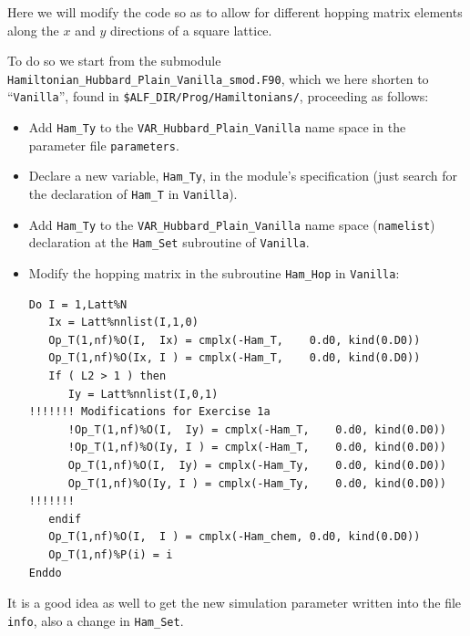\documentclass[10pt,modern]{scrartcl}
\numberwithin{exerciseitem}{exercise} %
\begin{document}



Here we will modify the code  so as to allow  for different hopping matrix elements along the $x$ and $y$ directions of a square lattice.

To do so we start from the submodule \texttt{Hamiltonian\_Hubbard\_Plain\_Vanilla\_smod.F90}, which we here shorten to ``\texttt{Vanilla}'', found in \texttt{\$ALF\_DIR/Prog/Hamiltonians/}, proceeding as follows: 
\begin{itemize}
	\item Add \texttt{Ham\_Ty} to the \texttt{VAR\_Hubbard\_Plain\_Vanilla} name space in the parameter file \texttt{parameters}.
	\item Declare a new variable, \texttt{Ham\_Ty}, in the module's specification (just search for the declaration of \texttt{Ham\_T} in \texttt{Vanilla}).
	\item Add \texttt{Ham\_Ty} to the \texttt{VAR\_Hubbard\_Plain\_Vanilla} name space (\texttt{namelist}) declaration at the \texttt{Ham\_Set} subroutine of \texttt{Vanilla}.
	\item Modify the hopping matrix in the subroutine \texttt{Ham\_Hop} in \texttt{Vanilla}:
\begin{lstlisting}[style=fortran]
Do I = 1,Latt%N
   Ix = Latt%nnlist(I,1,0)
   Op_T(1,nf)%O(I,  Ix) = cmplx(-Ham_T,    0.d0, kind(0.D0))
   Op_T(1,nf)%O(Ix, I ) = cmplx(-Ham_T,    0.d0, kind(0.D0))
   If ( L2 > 1 ) then
      Iy = Latt%nnlist(I,0,1)
!!!!!!! Modifications for Exercise 1a
      !Op_T(1,nf)%O(I,  Iy) = cmplx(-Ham_T,    0.d0, kind(0.D0))
      !Op_T(1,nf)%O(Iy, I ) = cmplx(-Ham_T,    0.d0, kind(0.D0))
      Op_T(1,nf)%O(I,  Iy) = cmplx(-Ham_Ty,    0.d0, kind(0.D0))
      Op_T(1,nf)%O(Iy, I ) = cmplx(-Ham_Ty,    0.d0, kind(0.D0))
!!!!!!!
   endif
   Op_T(1,nf)%O(I,  I ) = cmplx(-Ham_chem, 0.d0, kind(0.D0))
   Op_T(1,nf)%P(i) = i 
Enddo
\end{lstlisting} 
\end{itemize}
It is a good idea as well to get the new simulation parameter written into the file \texttt{info}, also a change in \texttt{Ham\_Set}.
\end{document}
